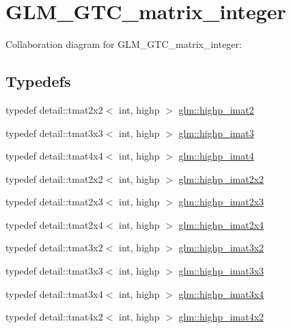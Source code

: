 \hypertarget{group__gtc__matrix__integer}{
\section{GLM\_\-GTC\_\-matrix\_\-integer}
\label{group__gtc__matrix__integer}
}


Collaboration diagram for GLM\_\-GTC\_\-matrix\_\-integer:\subsection*{Typedefs}
\begin{CompactItemize}
\item 
typedef detail::tmat2x2$<$ int, highp $>$ \hyperlink{group__gtc__matrix__integer_g70eae282157f23589db24f4664bbf956}{glm::highp\_\-imat2}
\item 
typedef detail::tmat3x3$<$ int, highp $>$ \hyperlink{group__gtc__matrix__integer_gf12b3aa7e16a88b1fcf51be9a132048c}{glm::highp\_\-imat3}
\item 
typedef detail::tmat4x4$<$ int, highp $>$ \hyperlink{group__gtc__matrix__integer_g9ca2f5624891bd1ac993fcde4dd24ac1}{glm::highp\_\-imat4}
\item 
typedef detail::tmat2x2$<$ int, highp $>$ \hyperlink{group__gtc__matrix__integer_g9646ff5ef973234755e63e727c5a37fc}{glm::highp\_\-imat2x2}
\item 
typedef detail::tmat2x3$<$ int, highp $>$ \hyperlink{group__gtc__matrix__integer_g7b7079ab95ac8f533ac565fcf1341c76}{glm::highp\_\-imat2x3}
\item 
typedef detail::tmat2x4$<$ int, highp $>$ \hyperlink{group__gtc__matrix__integer_g84aec2e744ecac589fe8d502266e8efc}{glm::highp\_\-imat2x4}
\item 
typedef detail::tmat3x2$<$ int, highp $>$ \hyperlink{group__gtc__matrix__integer_g9780c1bc052a34c59dc95f4dd9e1a5c8}{glm::highp\_\-imat3x2}
\item 
typedef detail::tmat3x3$<$ int, highp $>$ \hyperlink{group__gtc__matrix__integer_g4e7c11e49de5d71067b95a87c84308a8}{glm::highp\_\-imat3x3}
\item 
typedef detail::tmat3x4$<$ int, highp $>$ \hyperlink{group__gtc__matrix__integer_g97ddf84f7ae0c5d4d3ecc18bb1d47449}{glm::highp\_\-imat3x4}
\item 
typedef detail::tmat4x2$<$ int, highp $>$ \hyperlink{group__gtc__matrix__integer_gd998dce143f674a95a25241ff6e5e7d2}{glm::highp\_\-imat4x2}
\item 

\end{CompactItemize}
